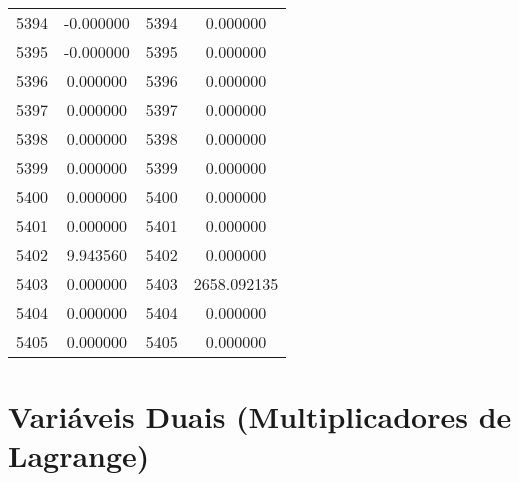 \documentclass[12pt]{article}
\begin{document}
\begin{longtable}{@{}cccc@{}}
5394 & -0.000000 & 5394 & 0.000000 \\
5395 & -0.000000 & 5395 & 0.000000 \\
5396 & 0.000000 & 5396 & 0.000000 \\
5397 & 0.000000 & 5397 & 0.000000 \\
5398 & 0.000000 & 5398 & 0.000000 \\
5399 & 0.000000 & 5399 & 0.000000 \\
5400 & 0.000000 & 5400 & 0.000000 \\
5401 & 0.000000 & 5401 & 0.000000 \\
5402 & 9.943560 & 5402 & 0.000000 \\
5403 & 0.000000 & 5403 & 2658.092135 \\
5404 & 0.000000 & 5404 & 0.000000 \\
5405 & 0.000000 & 5405 & 0.000000 \\

\end{longtable}

\section{Variáveis Duais (Multiplicadores de Lagrange)}
\end{document}
